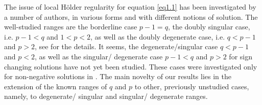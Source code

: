 \documentclass[a4paper,11pt,fullpage]{article}
\numberwithin{equation}{section}
\begin{document}
 The issue of local H\"{o}lder regularity for  equation \eqref{eq1.1} has been investigated by a number of authors, in various forms and with different notions of solution. 
 The well-studied ranges are the borderline case $p-1=q$, the doubly singular case, i.e.
$p-1<q$ and $1<p<2$, as well as the doubly degenerate case, i.e. $q < p-1$ and $p > 2$, see \cite{And, Ara, Bog1, Bog2, Bog3, Bog4, Cas, Cia2, Die, Gia, Hen, Hen1, Hen2, Iva1, Iva2, Iva3, Iva4, Kin1, Kuu1, Kuu2, Lia, Lia1, Por, Urb, Ves1, Ves} for the details. It seems, the degenerate/singular case $q< p-1$ and $p<2$, as well as the singular/ degenerate case $p-1< q$ and $p>2$ for sign changing solutions  have not yet been studied. These cases were investigated only for non-negative solutions in \cite{Cia1}. The main novelty of our results lies in the extension of the known ranges of $q$ and $p$ to other, previously unstudied cases, namely, to degenerate/ singular and singular/ degenerate ranges.
\end{document}
